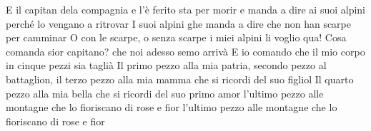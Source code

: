 \beginverse
E il capitan dela compagnia
e l'è ferito sta per morir
e manda a dire ai suoi alpini
perché lo vengano a ritrovar
\endverse
\beginverse
I suoi alpini ghe manda a dire
che non han scarpe per camminar
O con le scarpe, o senza scarpe
i miei alpini li voglio qua!
\endverse
\beginverse
Cosa comanda sior capitano?
che noi adesso semo arrivà
E io comando che il mio corpo
in cinque pezzi sia taglià
\endverse
\beginverse
Il primo pezzo alla mia patria,
secondo pezzo al battaglion,
il terzo pezzo alla mia mamma
che si ricordi del suo figliol
\endverse
\beginverse
Il quarto pezzo alla mia bella
che si ricordi del suo primo amor
l'ultimo pezzo alle montagne
che lo fioriscano di rose e fior
l'ultimo pezzo alle montagne
che lo fioriscano di rose e fior
\endverse
\endsong
